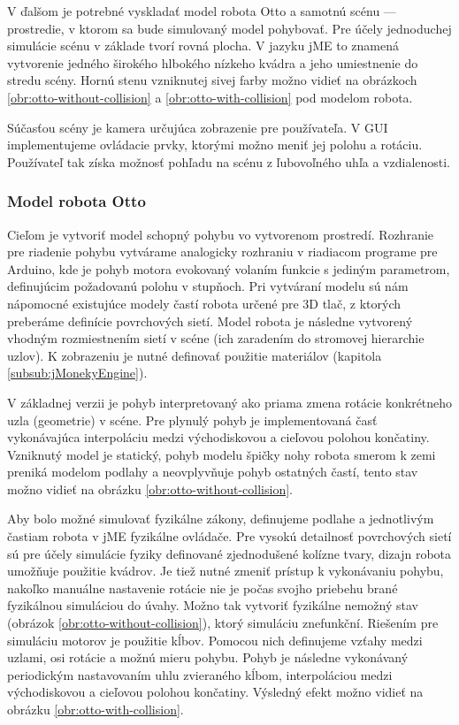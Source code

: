 V ďalšom je potrebné vyskladať model robota Otto a samotnú scénu --- prostredie, v ktorom sa bude simulovaný model pohybovať. Pre účely jednoduchej simulácie scénu v základe tvorí rovná plocha. V jazyku jME to znamená vytvorenie jedného širokého hlbokého nízkeho kvádra a jeho umiestnenie do stredu scény. Hornú stenu vzniknutej  sivej farby možno vidieť na obrázkoch \ref{obr:otto-without-collision} a \ref{obr:otto-with-collision} pod modelom robota.

Súčasťou scény je kamera určujúca zobrazenie pre používateľa. V GUI implementujeme ovládacie prvky, ktorými možno meniť jej polohu a rotáciu. Používateľ tak získa možnosť pohľadu na scénu z ľubovoľného uhľa a vzdialenosti. 

\subsubsection{Model robota Otto}
Cieľom je vytvoriť model schopný pohybu vo vytvorenom prostredí. Rozhranie pre riadenie pohybu vytvárame analogicky rozhraniu v riadiacom programe pre Arduino, kde je pohyb motora evokovaný volaním funkcie s jediným parametrom, definujúcim požadovanú polohu v stupňoch. Pri vytváraní modelu sú nám nápomocné existujúce modely častí robota určené pre 3D tlač, z ktorých preberáme definície povrchových sietí. Model robota je následne vytvorený vhodným rozmiestnením sietí v scéne (ich zaradením do stromovej hierarchie uzlov). K zobrazeniu je nutné definovať použitie materiálov (kapitola \ref{subsub:jMonekyEngine}).

V základnej verzii je pohyb interpretovaný ako priama zmena rotácie konkrétneho uzla (geometrie) v scéne. Pre plynulý pohyb je implementovaná časť vykonávajúca interpoláciu medzi východiskovou a cieľovou polohou končatiny. Vzniknutý model je statický, pohyb modelu špičky nohy robota smerom k zemi preniká modelom podlahy a neovplyvňuje pohyb ostatných častí, tento stav možno vidieť na obrázku \ref{obr:otto-without-collision}.

Aby bolo možné simulovať fyzikálne zákony, definujeme podlahe a jednotlivým častiam robota v jME fyzikálne ovládače. Pre vysokú detailnosť povrchových sietí sú pre účely simulácie fyziky definované zjednodušené kolízne tvary, dizajn robota umožňuje použitie kvádrov. Je tiež nutné zmeniť prístup k vykonávaniu pohybu, nakoľko manuálne nastavenie rotácie nie je počas svojho priebehu brané fyzikálnou simuláciou do úvahy. Možno tak vytvoriť fyzikálne nemožný stav (obrázok \ref{obr:otto-without-collision}), ktorý simuláciu znefunkční. Riešením pre simuláciu motorov je použitie kĺbov. Pomocou nich definujeme vzťahy medzi uzlami, osi rotácie a možnú mieru pohybu. Pohyb je následne vykonávaný periodickým nastavovaním uhlu zvieraného kĺbom, interpoláciou medzi východiskovou a cieľovou polohou končatiny. Výsledný efekt možno vidieť na obrázku \ref{obr:otto-with-collision}.

